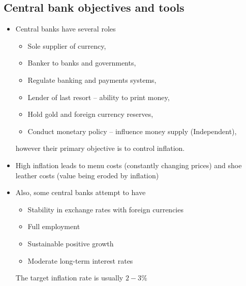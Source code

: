 \documentclass[../notes_compiled.tex]{subfiles}
\begin{document}
\subsection{Central bank objectives and tools}
\begin{itemize}
\item Central banks have several roles
\begin{itemize}
\item Sole supplier of currency,
\item Banker to banks and governments,
\item Regulate banking and payments systems,
\item Lender of last resort -- ability to print money,
\item Hold gold and foreign currency reserves,
\item Conduct monetary policy -- influence money supply (Independent),
\end{itemize}
however their primary objective is to control inflation.
\item High inflation leads to menu costs (constantly changing prices) and shoe leather costs (value being eroded by inflation)
\item Also, some central banks attempt to have
\begin{itemize}
\item Stability in exchange rates with foreign currencies
\item Full employment
\item Sustainable positive growth
\item Moderate long-term interest rates
\end{itemize}
The target inflation rate is usually $2-3\%$
\end{itemize}
\end{document}
